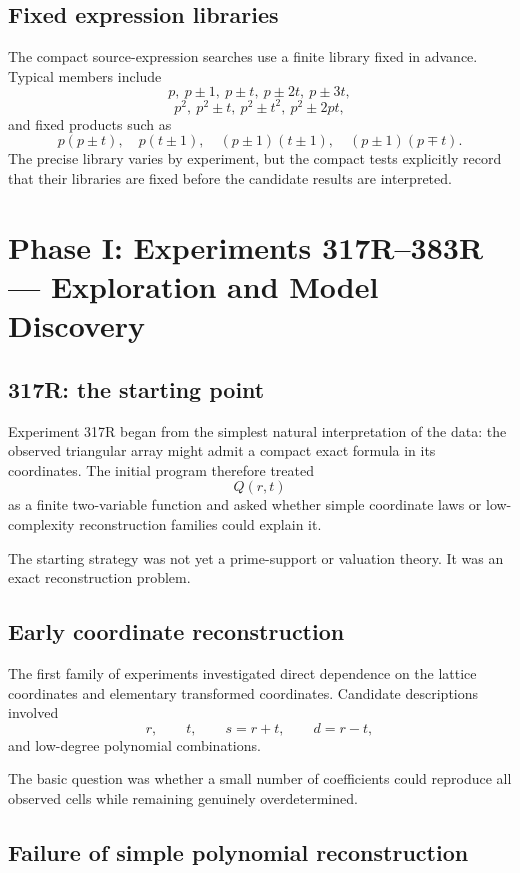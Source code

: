 \documentclass[11pt,a4paper]{article}
\begin{document}
\subsection{Fixed expression libraries}

The compact source-expression searches use a finite library fixed in advance. Typical members include
\[
p,\ p\pm1,\ p\pm t,\ p\pm2t,\ p\pm3t,
\]
\[
p^2,\ p^2\pm t,\ p^2\pm t^2,\ p^2\pm2pt,
\]
and fixed products such as
\[
p(p\pm t),\quad p(t\pm1),\quad
(p\pm1)(t\pm1),\quad
(p\pm1)(p\mp t).
\]
The precise library varies by experiment, but the compact tests explicitly record that their libraries are fixed before the candidate results are interpreted.

\section{Phase I: Experiments 317R--383R --- Exploration and Model Discovery}

\subsection{317R: the starting point}

Experiment 317R began from the simplest natural interpretation of the data: the observed triangular array might admit a compact exact formula in its coordinates. The initial program therefore treated
\[
Q(r,t)
\]
as a finite two-variable function and asked whether simple coordinate laws or low-complexity reconstruction families could explain it.

The starting strategy was not yet a prime-support or valuation theory. It was an exact reconstruction problem.

\subsection{Early coordinate reconstruction}

The first family of experiments investigated direct dependence on the lattice coordinates and elementary transformed coordinates. Candidate descriptions involved
\[
r,\qquad t,\qquad s=r+t,\qquad d=r-t,
\]
and low-degree polynomial combinations.

The basic question was whether a small number of coefficients could reproduce all observed cells while remaining genuinely overdetermined.

\subsection{Failure of simple polynomial reconstruction}
\end{document}
